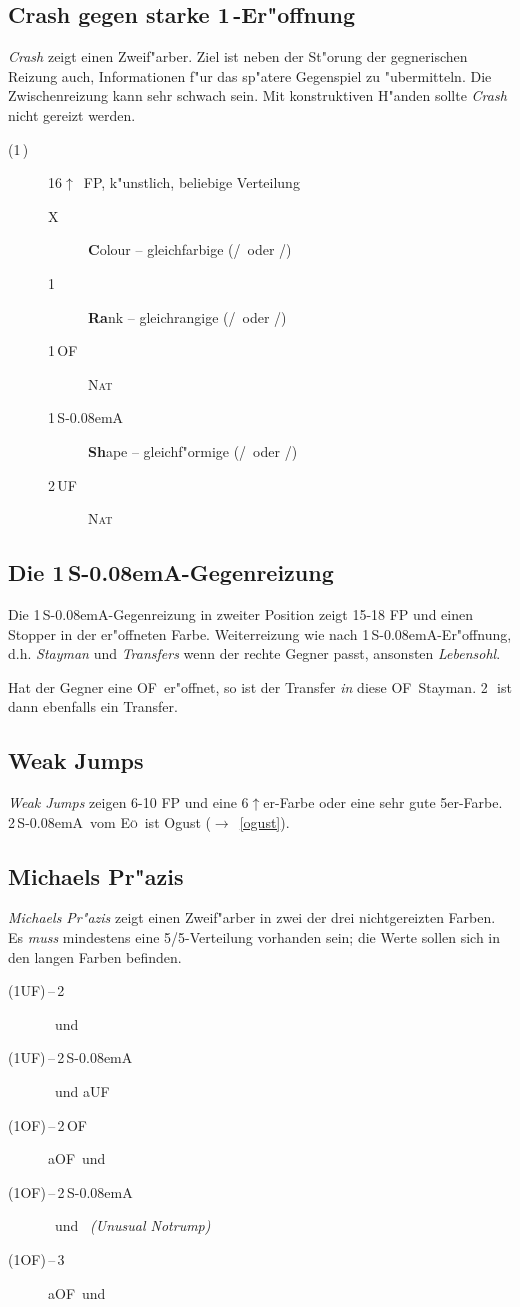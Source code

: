 \documentclass[11pt,german,twocolumn]{scrartcl}
\def\kar{\nobreak\,\Di}
\def\tre{\nobreak\,\Cl}
\def\pi{\Sp}
\def\co{\He}
\def\ka{\Di}
\def\tr{\Cl}
\def\ra{$\rightarrow$}
\def\pl{$\uparrow$}
\def\uf{\nobreak\textsf{\,UF}}
\def\of{\nobreak\textsf{\,OF}}
\def\ufa{\nobreak\textsf{UF}}
\def\aufa{\nobreak\textsf{aUF}}
\def\ofa{\nobreak\textsf{OF}}
\def\aofa{\nobreak\textsf{aOF}}
\def\sa{\nobreak\textsf{S\kern-0.08emA}}
\def\SA{\nobreak\,\sa}
\def\kontra{\textsf{X}}
\def\sep{\nobreak\,--\,}
\newcommand{\conv}[1]{\emph{#1}}
\def\nat{\textsc{Nat}}
\def\eo{\textsc{E\"o}}
\def\bdsc{\begin{description}}
\def\edsc{\end{description}}
\newcommand{\Index}[1]{#1\index{#1}}
\begin{document}
\subsection{Crash gegen starke 1\tre-Er"offnung}

\conv{Crash} zeigt einen Zweif"arber. Ziel ist neben der St"orung der
gegnerischen Reizung auch, Informationen f"ur das sp"atere Gegenspiel
zu "ubermitteln.  Die Zwischenreizung kann sehr schwach sein.  Mit
konstruktiven H"anden sollte \conv{Crash} nicht gereizt werden.

\bdsc
\item[(1\tre)] 16\pl\ FP, k"unstlich, beliebige Verteilung
\bdsc
\item[\kontra] \textbf{C}olour -- gleichfarbige (\tr/\pi\ oder \ka/\co)
\item[1\kar] \textbf{Ra}nk -- gleichrangige (\tr/\ka\ oder \co/\pi)
\item[1\of] \nat
\item[1\SA] \textbf{Sh}ape -- gleichf"ormige (\tr/\co\ oder \ka/\pi)
\item[2\uf] \nat
\edsc
\edsc

\subsection{Die 1\SA-Gegenreizung}

Die 1\SA-Gegenreizung in zweiter Position zeigt 15-18 FP und einen
Stopper in der er"offneten Farbe. Weiterreizung wie nach
1\SA-Er"offnung, d.h. \conv{Stayman} und \conv{Transfers} wenn der
rechte Gegner passt, ansonsten \Index{\conv{Lebensohl}}.

Hat der Gegner eine \ofa\ er"offnet, so ist der Transfer \emph{in} diese \ofa\
Stayman. 2\tre\ ist dann ebenfalls ein Transfer.

\subsection{Weak Jumps}

\conv{Weak Jumps} zeigen 6-10 FP und eine 6\pl{}er-Farbe oder eine
sehr gute 5er-Farbe. 2\SA\ vom \eo\ ist Ogust\index{Ogust}
(\ra~\ref{ogust}).

\subsection{Michaels Pr"azis}

\conv{Michaels Pr"azis} zeigt einen Zweif"arber in zwei der drei
nichtgereizten Farben.  Es \emph{muss} mindestens eine 5/5-Verteilung
vorhanden sein; die Werte sollen sich in den langen Farben befinden.
%
\bdsc
\item[(1\ufa)\sep2\kar] \co\ und \pi
\item[(1\ufa)\sep2\SA] \co\ und \aufa
\item[(1\ofa)\sep2\of] \aofa\ und \tr
\item[(1\ofa)\sep2\SA] \tr\ und \ka\ \conv{(Unusual Notrump)}
\item[(1\ofa)\sep3\tre] \aofa\ und \ka
\edsc
\end{document}
